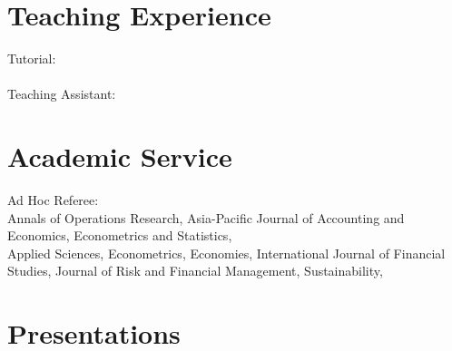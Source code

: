 \documentclass[margin]{res}
\begin{document}
\begin{resume}
		
		\section{\sc Teaching Experience}
		Tutorial: \\
		\\
		Teaching Assistant: \\
		
		
		\section{\sc Academic Service}
		
		Ad Hoc Referee: \\
		Annals of Operations Research,
		Asia-Pacific Journal of Accounting and Economics,
		Econometrics and Statistics, 
		\\
		Applied Sciences,
		Econometrics,
		Economies, 
		International Journal of Financial Studies,
		Journal of Risk and Financial Management,
		Sustainability,

		
		\vspace{5mm}
		
		\section{\sc Presentations}
		

\end{resume}
\end{document}
